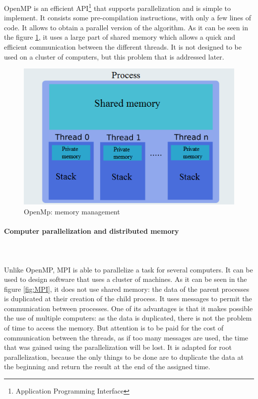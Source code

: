 OpenMP is an efficient API\footnote{Application Programming Interface} that supports parallelization and is simple to implement. It consists some pre-compilation instructions, with only a few lines of code. It allows to obtain a parallel version of the algorithm. As it can be seen in the figure \ref{fig:OpenMp}, it uses a large part of shared memory which allows a quick and efficient communication between the different threads. It is not designed to be used on a cluster of computers, but this problem that is addressed later.
\begin{figure}[!h] 
\centerline{\includegraphics[scale=0.50]{5Solutions_and_schedule/5.1MultithreadingMP_boost_Visual_MPI_5000_Zotero_Project_Baptiste/OpenMP}}
   \caption{\label{étiquette} OpenMp: memory management}
\label{fig:OpenMp}
\end{figure}
\newpage
\paragraph{Computer parallelization and distributed memory}\mbox{}\\\mbox{}\\

Unlike OpenMP, MPI is able to parallelize a task for several computers. It can be used to design software that uses a cluster of machines. As it can be seen in the figure \ref{fig:MPI}, it does not use shared memory: the data of the parent processes is duplicated at their creation of the child process. It uses messages to permit the communication between processes. One of its advantages is that it makes possible the use of multiple computers: as the data is duplicated, there is not the problem of time to access the memory. But attention is to be paid for the cost of communication between the threads, as if too many messages are used, the time that was gained using the parallelization will be lost. It is adapted for root parallelization, because the only things to be done are to duplicate the data at the beginning and return the result at the end of the assigned time.

